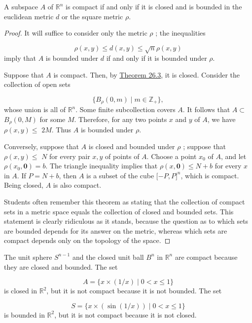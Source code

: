 \begin{theorem}
\label{thm:\thetheorem}
 A subspace \(A\) of \(\mathbb{R}^{n}\) is compact if and only if it is closed and is bounded in the euclidean metric \(d\) or the square metric \(\rho\).

\end{theorem}
\begin{proof}
It will suffice to consider only the metric \(\rho\) ; the inequalities

\[
\rho ( {x,y}) \leq d( {x,y}) \leq \sqrt{n}\rho ( {x,y})
\]
imply that \(A\) is bounded under \(d\) if and only if it is bounded under \(\rho\).

Suppose that \(A\) is compact. Then, by \hyperref[thm:26.3]{Theorem 26.3}, it is closed. Consider the collection of open sets

\[
\{ {B_{\rho }( {0,m}) \mid m \in {\mathbb{Z}}_{ + }}\},
\]
whose union is all of \(\mathbb{R}^{n}\). Some finite subcollection covers \(A\). It follows that \(A \subset\) \(B_{\rho }( {0,M})\) for some \(M\). Therefore, for any two points \(x\) and \(y\) of \(A\), we have \(\rho ( {x,y}) \leq\) \({2M}\). Thus \(A\) is bounded under \(\rho\).

Conversely, suppose that \(A\) is closed and bounded under \(\rho\) ; suppose that \(\rho ( {x,y}) \leq\) \(N\) for every pair \(x,y\) of points of \(A\). Choose a point \(x_{0}\) of \(A\), and let \(\rho ( {x_{0},\mathbf{0}}) = b\). The triangle inequality implies that \(\rho ( {x,\mathbf{0}}) \leq N + b\) for every \(x\) in \(A\). If \(P = N + b\), then \(A\) is a subset of the cube \([ -P,P{] }^{n}\), which is compact. Being closed, \(A\) is also compact.

Students often remember this theorem as stating that the collection of compact sets in a metric space equals the collection of closed and bounded sets. This statement is clearly ridiculous as it stands, because the question as to which sets are bounded depends for its answer on the metric, whereas which sets are compact depends only on the topology of the space.
\end{proof}

\begin{centeredblock*}
\begin{example}
\label{ex:\thesection.\theexample}
 The unit sphere \(S^{n - 1}\) and the closed unit ball \(B^{n}\) in \(\mathbb{R}^{n}\) are compact because they are closed and bounded. The set

\[
A = \{ x \times ( {1/x}) \mid 0 < x \leq 1\}
\]
is closed in \(\mathbb{R}^{2}\), but it is not compact because it is not bounded. The set

\[
S = \{ x \times ( {\sin ( {1/x}) }) \mid 0 < x \leq 1\}
\]
is bounded in \(\mathbb{R}^{2}\), but it is not compact because it is not closed.
\end{example}
\end{centeredblock*}

